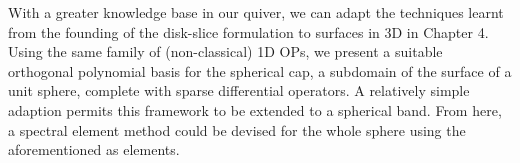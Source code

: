 With a greater knowledge base in our quiver, we can adapt the techniques learnt from the founding of the disk-slice formulation to surfaces in 3D in Chapter 4. Using the same family of (non-classical) 1D OPs, we present a suitable orthogonal polynomial basis for the spherical cap, a subdomain of the surface of a unit sphere, complete with sparse differential operators. A relatively simple adaption permits this framework to be extended to a spherical band. From here, a spectral element method could be devised for the whole sphere using the aforementioned as elements.

